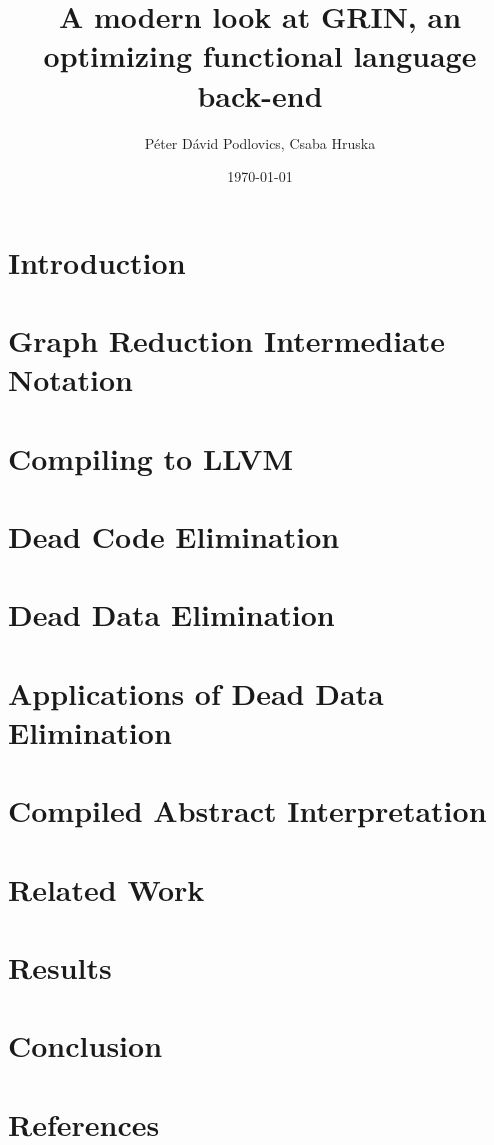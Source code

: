 \documentclass[10pt,a4paper,oneside]{article}
\title{A modern look at GRIN, an optimizing functional language back-end}
\date{\today}
\author{Péter Dávid Podlovics, Csaba Hruska}
\begin{document}
	
	
	
	\tableofcontents
	
	\section{Introduction} \label{sec-intro}
	
	
	\section{Graph Reduction Intermediate Notation}
	
	
	\section{Compiling to LLVM}
	
	
	\section{Dead Code Elimination}
	
	
	\section{Dead Data Elimination}
	
	
	\section{Applications of Dead Data Elimination}
	
	
	\section{Compiled Abstract Interpretation}
	\section{Related Work}
	\section{Results}
	\section{Conclusion}
	\section{References}
	
	

	
\end{document}
